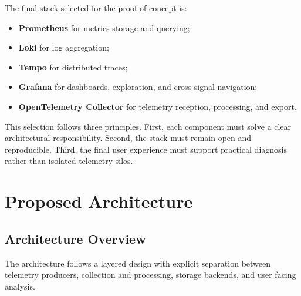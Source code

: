 The final stack selected for the proof of concept is:
\begin{itemize}
    \item \textbf{Prometheus} for metrics storage and querying;
    \item \textbf{Loki} for log aggregation;
    \item \textbf{Tempo} for distributed traces;
    \item \textbf{Grafana} for dashboards, exploration, and cross signal navigation;
    \item \textbf{OpenTelemetry Collector} for telemetry reception, processing, and export.
\end{itemize}

This selection follows three principles. First, each component must solve a clear architectural responsibility. Second, the stack must remain open and reproducible. Third, the final user experience must support practical diagnosis rather than isolated telemetry silos.

\section{Proposed Architecture}
\label{sec:architecture_design}

\subsection{Architecture Overview}
\label{subsec:architecture_overview}

The architecture follows a layered design with explicit separation between telemetry producers, collection and processing, storage backends, and user facing analysis.

